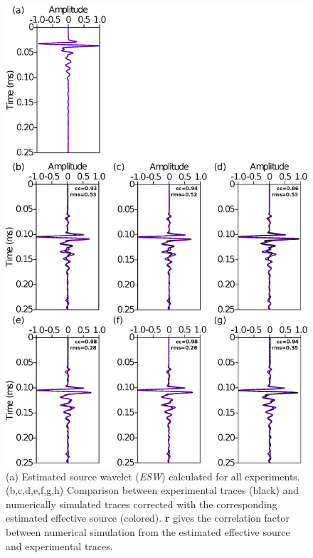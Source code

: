 \documentclass[manuscript,revised]{geophysics}
\begin{document}
\begin{figure}[!h]
	\centering
	\includegraphics[scale=0.4]{fig/panel_lswe_all.eps}
	\caption{(a) Estimated source wavelet (\textit{ESW}) calculated for all experiments. (b,c,d,e,f,g,h) Comparison between experimental traces (black) and numerically simulated traces corrected with the corresponding estimated effective source (colored). \textbf{r} gives the correlation factor between numerical simulation from the estimated effective source and experimental traces.}
	\label{panel_srcest_2d_mean}
\end{figure}
\end{document}

